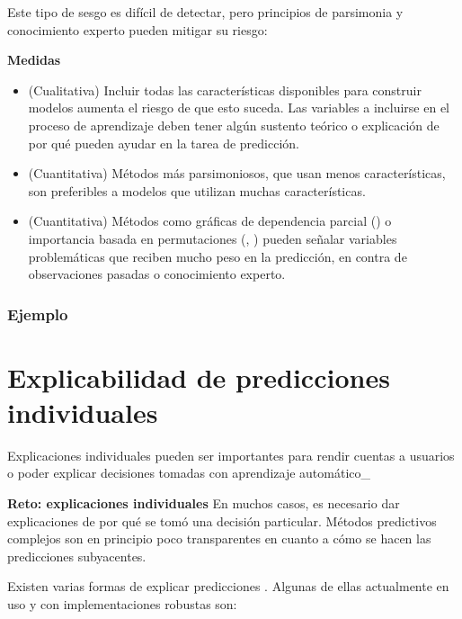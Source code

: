 \documentclass[
]{book}
\providecommand{\tightlist}{%
  \setlength{\itemsep}{0pt}\setlength{\parskip}{0pt}}
\let\BeginKnitrBlock\begin \let\EndKnitrBlock\end
\begin{document}
Este tipo de sesgo es difícil de detectar, pero principios de parsimonia y conocimiento experto pueden mitigar su riesgo:

\BeginKnitrBlock{rmdtip}
\textbf{Medidas}

\begin{itemize}
\tightlist
\item
  (Cualitativa) Incluir todas las características disponibles para construir modelos aumenta el riesgo de
  que esto suceda. Las variables a incluirse en el proceso de aprendizaje deben tener algún sustento teórico o explicación
  de por qué pueden ayudar en la tarea de predicción.
\item
  (Cuantitativa) Métodos más parsimoniosos, que usan menos características, son preferibles a modelos que utilizan
  muchas características.
\item
  (Cuantitativa) Métodos como gráficas de dependencia parcial (\citep{friedman}) o importancia basada en permutaciones (\citep{breimanrandom}, \citep{molnar2019}) pueden señalar
  variables problemáticas que reciben mucho peso en la predicción, en contra de observaciones pasadas o conocimiento experto.
\end{itemize}
\EndKnitrBlock{rmdtip}

\hypertarget{ejemplo-5}{%
\subsubsection*{Ejemplo}\label{ejemplo-5}}


\hypertarget{explicabilidad-de-predicciones-individuales}{%
\section{Explicabilidad de predicciones individuales}\label{explicabilidad-de-predicciones-individuales}}

Explicaciones individuales pueden ser importantes para rendir cuentas a usuarios o poder explicar decisiones tomadas
con aprendizaje automático\_

\BeginKnitrBlock{rmdnote}
\textbf{Reto: explicaciones individuales}
En muchos casos, es necesario dar explicaciones de por qué se tomó una decisión particular. Métodos predictivos complejos
son en principio poco transparentes en cuanto a cómo se hacen las predicciones subyacentes.
\EndKnitrBlock{rmdnote}

Existen varias formas de explicar predicciones \citep{molnar2019}. Algunas de ellas actualmente en uso y con implementaciones
robustas son:
\end{document}
